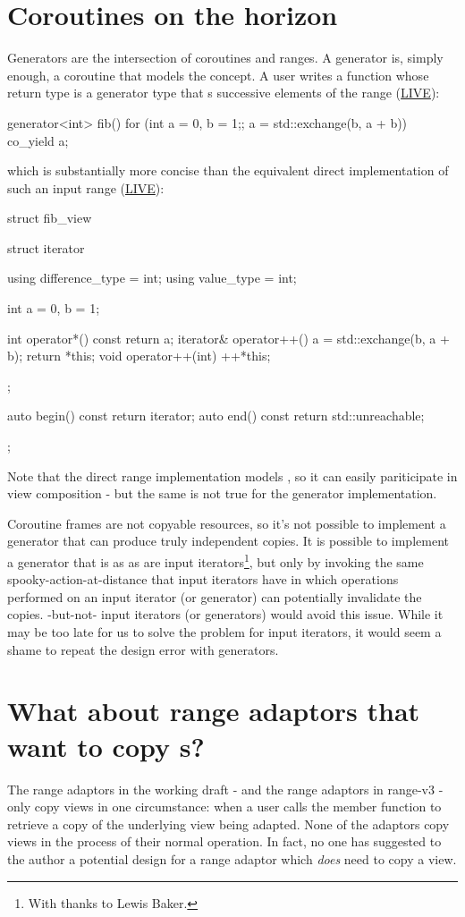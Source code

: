 \section{Coroutines on the horizon}

Generators are the intersection of coroutines and ranges. A generator is, simply
enough, a coroutine that models the  concept. A user writes a
function whose return type is a generator type that s
successive elements of the range
(\href{https://wandbox.org/permlink/kxHIkGckrCWXnMxr}{LIVE}):
\begin{codeblock}
generator<int> fib() {
  for (int a = 0, b = 1;; a = std::exchange(b, a + b))
    co_yield a;
}
\end{codeblock}
which is substantially more concise than the equivalent direct implementation of
such an input range
(\href{https://wandbox.org/permlink/tlqfMsvXuoz4hSy4}{LIVE}):
\begin{codeblock}
struct fib_view {
  struct iterator {
    using difference_type = int;
    using value_type = int;

    int a = 0, b = 1;

    int operator*() const { return a; }
    iterator& operator++() {
      a = std::exchange(b, a + b);
      return *this;
    }
    void operator++(int) { ++*this; }
  };

  auto begin() const { return iterator{}; }
  auto end() const { return std::unreachable; }
};
\end{codeblock}
Note that the direct range implementation models , so it can easily
pariticipate in view composition - but the same is not true for the generator
implementation.

Coroutine frames are not copyable resources, so it's not possible to implement a
generator that can produce truly independent copies. It is possible to implement
a generator that is as  as are input
iterators\footnote{With thanks to Lewis Baker.}, but only by invoking the same
spooky-action-at-distance that input iterators have in which operations
performed on an input iterator (or generator) can potentially invalidate the
copies. -but-not- input iterators (or generators)
would avoid this issue. While it may be too late for us to solve the problem for
input iterators, it would seem a shame to repeat the design error with
generators.

\section{What about range adaptors that want to copy s?}
The range adaptors in the working draft - and the range adaptors in range-v3 -
only copy views in one circumstance: when a user calls the 
member function to retrieve a copy of the underlying view being adapted. None of
the adaptors copy views in the process of their normal operation. In fact, no
one has suggested to the author a potential design for a range adaptor which
\emph{does} need to copy a view.

